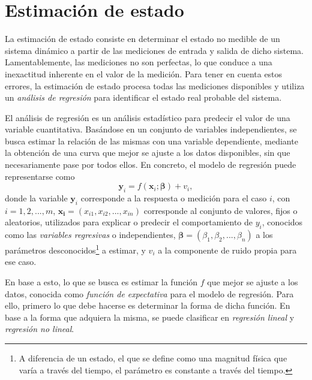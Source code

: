 \section{Estimación de estado}
La estimación de estado consiste en determinar el estado no medible de un sistema dinámico a partir de las mediciones de entrada y salida de dicho sistema. Lamentablemente, las mediciones no son perfectas, lo que conduce a una inexactitud inherente en el valor de la medición. Para tener en cuenta estos errores, la estimación de estado procesa todas las mediciones disponibles y utiliza un \textit{análisis de regresión} para identificar el estado real probable del sistema.

El análisis de regresión es un análisis estadístico para predecir el valor de una variable cuantitativa. Basándose en un conjunto de variables independientes, se busca estimar la relación de las mismas con una variable dependiente, mediante la obtención de una curva que mejor se ajuste a los datos disponibles, sin que necesariamente pase por todos ellos. En concreto, el modelo de regresión puede representarse como
\begin{equation}
    \textbf{y}_i = f(\textbf{x}_i; \bm{\beta}) + v_i,
    \label{eq:regressionmodel}
\end{equation}
donde la variable $\bm{y}_i$ corresponde a la respuesta o medición para el caso $i$, con $i = 1, 2, ..., m$, $\bm{x_i} = (x_{i1}, x_{i2}, ..., x_{in})$ corresponde al conjunto de valores, fijos o aleatorios, utilizados para explicar o predecir el comportamiento de $y_i$, conocidos como las \textit{variables regresivas} o independientes, $\bm{\beta} = (\beta_1, \beta_2, ..., \beta_n)$ a los parámetros desconocidos\footnote{A diferencia de un estado, el que se define como una magnitud física que varía a través del tiempo, el parámetro es constante a través del tiempo.} a estimar, y $v_i$ a la componente de ruido propia para ese caso.

En base a esto, lo que se busca es estimar la función $f$ que mejor se ajuste a los datos, conocida como \textit{función de expectativa} para el modelo de regresión. Para ello, primero lo que debe hacerse es determinar la forma de dicha función. En base a la forma que adquiera la misma, se puede clasificar en \textit{regresión lineal} y \textit{regresión no lineal}.


